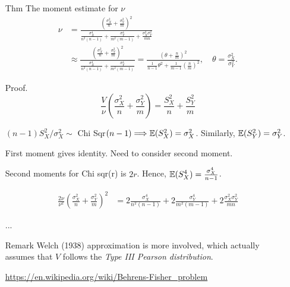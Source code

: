 \begin{frame}

	\begin{enumerate}
		\item[Thm ] The moment estimate for $\nu$
			\begin{align*}
	\nu &=   \frac{\left(  \frac{\sigma_X^2}{n}+ \frac{\sigma_Y^2}{m} \right)^2 }
{ \frac{\sigma_X^4}{n^2(n-1)}+\frac{\sigma_Y^4}{m^2(m-1) }+ \frac{\sigma_X^2\sigma_Y^2}{mn}}
	\\[2em] & \approx
\frac{\left(  \frac{\sigma_X^2}{n}+ \frac{\sigma_Y^2}{m} \right)^2 }
{ \frac{\sigma_X^4}{n^2(n-1)}+\frac{\sigma_Y^4}{m^2(m-1) }}
=
\frac{\left(\theta+ \frac{n}{m} \right)^2}{ \frac{1}{n-1}\theta^2 +  \frac{1}{m-1}\left(  \frac{n}{m}\right)^2},
\quad \theta= \frac{\sigma_X^2}{\sigma_Y^2}.
			\end{align*}
\vfill
\item[Proof.]
\[
	\frac{V}{\nu}\left( \frac{\sigma^2_X}{n}+\frac{\sigma^2_Y}{m} \right)= \frac{S^2_X}{n}+\frac{S^2_Y}{m}
\]
\vfill
\item[]$(n-1)S_X^2/\sigma_X^2\sim$ Chi Sqr$(n-1) \Longrightarrow\mathbb{E}(S_X^2)= \sigma_X^2$. Similarly, $\mathbb{E}(S_Y^2)= \sigma_Y^2$.
	\end{enumerate}
\end{frame}
\begin{frame}

	\begin{enumerate}
\item[] First moment gives identity. Need to consider second moment.
\item[] Second moments for Chi sqr(r) is $2r$. Hence, $\mathbb{E}(S_X^4) =  \frac{\sigma_X^4}{n-1}$.
\item[]
			\begin{align*}
			 \frac{2\nu}{\nu^2}
	\left( \frac{\sigma^2_X}{n}+\frac{\sigma^2_Y}{m} \right)^2
	&= 2\frac{\sigma^4_X}{n^2(n-1)}+2\frac{\sigma^4_Y}{m^2(m-1)}
	+  2\frac{\sigma_X^2\sigma_Y^2}{mn}
			\end{align*}
		\item[] ... \myEnd
			\vfill
	\item[Remark] Welch (1938) approximation is more involved, which actually assumes that $V$ follows the {\it Type III Pearson distribution}.
	\item[]	\url{https://en.wikipedia.org/wiki/Behrens-Fisher_problem}
	\end{enumerate}
\end{frame}
